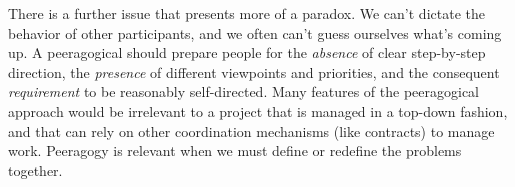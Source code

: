 There is a further issue that presents more of a paradox.  We can't
dictate the behavior of other participants, and we often can't guess
ourselves what's coming up.  A peeragogical 
should prepare people for the \emph{absence} of clear step-by-step
direction, the \emph{presence} of different viewpoints and priorities,
and the consequent \emph{requirement} to be reasonably self-directed.
Many features of the peeragogical approach would be irrelevant to a
project that is managed in a top-down fashion, and that can rely on
other coordination mechanisms (like contracts) to manage work.
Peeragogy is relevant when we must define or redefine the problems
together.

